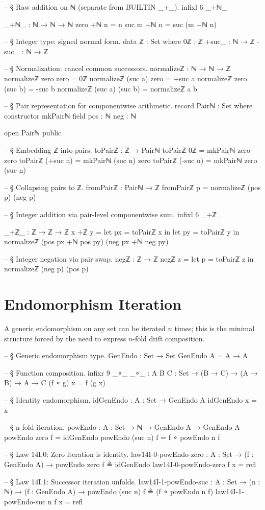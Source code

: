 \documentclass[11pt,a4paper]{book}
\begin{document}
\begin{code}
-- § Raw addition on ℕ (separate from BUILTIN _+_).
infixl 6 _+ℕ_

_+ℕ_ : ℕ → ℕ → ℕ
zero +ℕ n = n
suc m +ℕ n = suc (m +ℕ n)

-- § Integer type: signed normal form.
data ℤ : Set where
  0ℤ    : ℤ
  +suc_ : ℕ → ℤ
  -suc_ : ℕ → ℤ

-- § Normalization: cancel common successors.
normalizeℤ : ℕ → ℕ → ℤ
normalizeℤ zero zero = 0ℤ
normalizeℤ (suc a) zero = +suc a
normalizeℤ zero (suc b) = -suc b
normalizeℤ (suc a) (suc b) = normalizeℤ a b

-- § Pair representation for componentwise arithmetic.
record Pairℕ : Set where
  constructor mkPairℕ
  field
    pos : ℕ
    neg : ℕ

open Pairℕ public

-- § Embedding ℤ into pairs.
toPairℤ : ℤ → Pairℕ
toPairℤ 0ℤ = mkPairℕ zero zero
toPairℤ (+suc n) = mkPairℕ (suc n) zero
toPairℤ (-suc n) = mkPairℕ zero (suc n)

-- § Collapsing pairs to ℤ.
fromPairℤ : Pairℕ → ℤ
fromPairℤ p = normalizeℤ (pos p) (neg p)

-- § Integer addition via pair-level componentwise sum.
infixl 6 _+ℤ_

_+ℤ_ : ℤ → ℤ → ℤ
x +ℤ y =
  let px = toPairℤ x in
  let py = toPairℤ y in
  normalizeℤ (pos px +ℕ pos py) (neg px +ℕ neg py)

-- § Integer negation via pair swap.
negℤ : ℤ → ℤ
negℤ z =
  let p = toPairℤ z in
  normalizeℤ (neg p) (pos p)
\end{code}

\section{Endomorphism Iteration}

A generic endomorphism on any set can be iterated $n$ times; this is the minimal
structure forced by the need to express $n$-fold drift composition.

\begin{code}
-- § Generic endomorphism type.
GenEndo : Set → Set
GenEndo A = A → A

-- § Function composition.
infixr 9 _∘_
_∘_ : {A B C : Set} → (B → C) → (A → B) → A → C
(f ∘ g) x = f (g x)

-- § Identity endomorphism.
idGenEndo : {A : Set} → GenEndo A
idGenEndo x = x

-- § n-fold iteration.
powEndo : {A : Set} → ℕ → GenEndo A → GenEndo A
powEndo zero    f = idGenEndo
powEndo (suc n) f = f ∘ powEndo n f

-- § Law 14I.0: Zero iteration is identity.
law14I-0-powEndo-zero : {A : Set} → (f : GenEndo A) → powEndo zero f ≗ idGenEndo
law14I-0-powEndo-zero f x = refl

-- § Law 14I.1: Successor iteration unfolds.
law14I-1-powEndo-suc : {A : Set} → (n : ℕ) → (f : GenEndo A) → powEndo (suc n) f ≗ (f ∘ powEndo n f)
law14I-1-powEndo-suc n f x = refl
\end{code}
\end{document}

